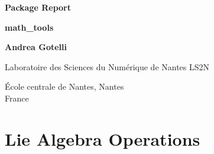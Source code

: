 \documentclass[12pt,a4paper]{book}
\begin{document}
\begin{titlepage}
   \begin{center}
       \vspace*{1cm}

		\textbf{Package Report}		
		
		\vspace{1.5cm}
		
        \Large{\textbf{math\_tools}}

            
        \vspace{1.5cm}

        \textbf{Andrea Gotelli}

        \vfill
            
            
        \vspace{0.8cm}
     
            
		\begin{flushleft}
			Laboratoire des Sciences du Numérique de Nantes LS2N
		\end{flushleft}
        École centrale de Nantes, Nantes\\
        France\\
       
       
            
   \end{center}
  
\end{titlepage}


\tableofcontents

\listoffigures






\chapter{Lie Algebra Operations}
\end{document}
